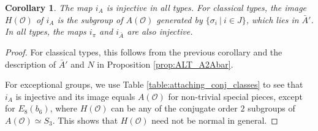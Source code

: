 \documentclass{amsart}
\newtheorem{corollary}[theorem]{Corollary}
\theoremstyle{definition}
\newcommand{\cP}{\mathcal{P}}
\newcommand{\cS}{\mathcal{S}}
\newcommand{\Ab}{\bar{A}}
\newcommand{\0}{\mathcal{O}}
\begin{document}

\begin{corollary} \label{cor:i_A_injective_all_types} 
The map $i_A$ is injective in all types. 
For classical types, the image $H(\0)$ of $i_A$ is 
the subgroup of $A(\0)$ generated by $\{\sigma_i \ | \ i \in J\}$, which lies in $\Ab'$.  
In all types, the maps $i_\pi$ and $i_{\Ab}$ are also
injective.
\end{corollary} 

\begin{proof}
For classical types, this follows from the previous corollary and the description of $\bar A'$ and $N$ in Proposition \ref{prop:ALT_A2Abar}.  

For exceptional groups, we use Table \ref{table:attaching_conj_classes} to see
that $i_A$ is injective and its image equals $A(\0)$ for non-trivial special pieces, except for $E_8(b_6)$, where $H(\0)$ can be any of the conjugate order $2$ subgroups of $A(\0)\simeq S_3$.  This shows that $H(\0)$ need not be normal in general.
\end{proof}
 
\end{document}
